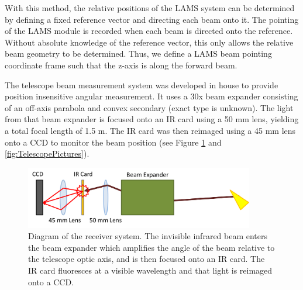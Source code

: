 \documentclass[12pt,twoside,english]{article}\usepackage[]{graphicx}\usepackage[]{color}
\begin{document}
With this method, the
relative positions of the LAMS system can be determined by defining a fixed reference vector and directing each beam onto it. The pointing of the LAMS module is recorded when each beam is directed onto the reference. Without absolute knowledge of the reference vector, this only allows the relative beam geometry to be determined. Thus, we define a LAMS beam pointing coordinate frame such that the z-axis is along the forward beam. 

The telescope beam measurement system was developed in house to provide position insensitive angular measurement. It uses a 30x beam expander consisting of an off-axis parabola and convex secondary (exact type is unknown). The light from that beam expander is focused onto an IR card using a 50 mm lens, yielding a total focal length of 1.5 m. The IR card was then reimaged using a 45 mm lens onto a CCD to monitor the beam position (see Figure \ref{fig:TelescopePointingRX} and \ref{fig:TelescopePictures}). 

\begin{figure}
\noindent \begin{centering}
\includegraphics[width=10cm]{SpecialGraphics/BeamPointing_ReceiverDiagram}  
\par\end{centering}
\protect\caption[Diagram of the LAMS receiver system]{\label{fig:TelescopePointingRX}Diagram of the receiver system. The invisible infrared beam enters the beam expander which amplifies the angle of the beam relative to the telescope optic axis, and is then focused onto an IR card. The IR card fluoresces at a visible wavelength and that light is reimaged onto a CCD.} 
\end{figure}
\end{document}
